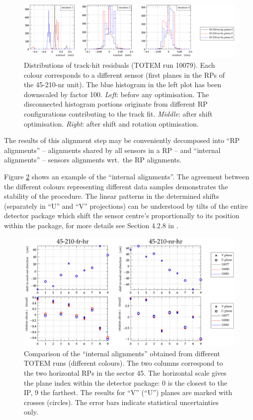 \documentclass[TOTEM]{cern/cernphprep}
\begin{document}
\begin{figure}[h!]
\begin{center}
\includegraphics[width=\hsize]{fig/calibration_fill/residuals.pdf}
\caption{%
Distributions of track-hit residuals (TOTEM run 10079). Each colour corresponds to a different sensor (first planes in the RPs of the 45-210-nr unit). The blue histogram in the left plot has been downscaled by factor 100. {\it Left}: before any optimisation. The disconnected histogram portions originate from different RP configurations contributing to the track fit. {\it Middle}: after shift optimisation. {\it Right}: after shift and rotation optimisation.
}
\label{fig:tb_residuals}
\end{center}
\end{figure}

The results of this alignment step may be conveniently decomposed into ``RP alignments'' -- alignments shared by all sensors in a RP -- and ``internal alignments'' -- sensors alignments wrt.~the RP alignments.

Figure \ref{fig:tb_example_internal} shows an example of the ``internal alignments''. The agreement between the different colours representing different data samples demonstrates the stability of the procedure. The linear patterns in the determined shifts (separately in ``U'' and ``V'' projections) can be understood by tilts of the entire detector package which shift the sensor centre's proportionally to its position within the package, for more details see Section 4.2.8 in \cite{jan_thesis}.

\begin{figure}[h!]
\begin{center}
\includegraphics[width=0.8\hsize]{fig/calibration_fill/plots_per_plane_left.pdf}
\caption{%
Comparison of the ``internal alignments'' obtained from different TOTEM runs (different colours). The two columns correspond to the two horizontal RPs in the sector 45. The horizontal scale gives the plane index within the detector package: 0 is the closest to the IP, 9 the farthest. The results for ``V'' (``U'') planes are marked with crosses (circles). The error bars indicate statistical uncertainties only.
}
\label{fig:tb_example_internal}
\end{center}
\end{figure}
\end{document}
